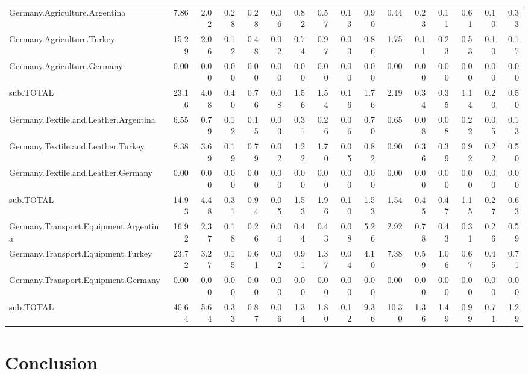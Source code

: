 \documentclass[a4paper]{article}\usepackage[]{graphicx}\usepackage[]{color}
\begin{document}
\begin{sidewaystable}[htbp]
\begin{tabular}{lrrrrrrrrrrrrrrr}
    Germany.Agriculture.Argentina & 7.86  & 2.02  & 0.28  & 0.28  & 0.06  & 0.82  & 0.57  & 0.13  & 0.90  & 0.44  & 0.23  & 0.11  & 0.61  & 0.10  & 0.33 \\
    Germany.Agriculture.Turkey & 15.29 & 2.06  & 0.12  & 0.48  & 0.02  & 0.74  & 0.97  & 0.03  & 0.86  & 1.75  & 0.11  & 0.23  & 0.53  & 0.10  & 0.17 \\
    Germany.Agriculture.Germany & 0.00  & 0.00  & 0.00  & 0.00  & 0.00  & 0.00  & 0.00  & 0.00  & 0.00  & 0.00  & 0.00  & 0.00  & 0.00  & 0.00  & 0.00 \\
    sub.TOTAL & 23.16 & 4.08  & 0.40  & 0.76  & 0.08  & 1.56  & 1.54  & 0.16  & 1.76  & 2.19  & 0.34  & 0.35  & 1.14  & 0.20  & 0.50 \\
    Germany.Textile.and.Leather.Argentina & 6.55  & 0.79  & 0.12  & 0.15  & 0.03  & 0.31  & 0.26  & 0.06  & 0.70  & 0.65  & 0.08  & 0.08  & 0.22  & 0.05  & 0.13 \\
    Germany.Textile.and.Leather.Turkey & 8.38  & 3.69  & 0.19  & 0.79  & 0.02  & 1.22  & 1.70  & 0.05  & 0.82  & 0.90  & 0.36  & 0.39  & 0.92  & 0.22  & 0.50 \\
    Germany.Textile.and.Leather.Germany & 0.00  & 0.00  & 0.00  & 0.00  & 0.00  & 0.00  & 0.00  & 0.00  & 0.00  & 0.00  & 0.00  & 0.00  & 0.00  & 0.00  & 0.00 \\
    sub.TOTAL & 14.93 & 4.48  & 0.31  & 0.94  & 0.05  & 1.53  & 1.96  & 0.10  & 1.53  & 1.54  & 0.45  & 0.47  & 1.15  & 0.27  & 0.63 \\
    Germany.Transport.Equipment.Argentina & 16.92 & 2.37  & 0.18  & 0.26  & 0.04  & 0.44  & 0.43  & 0.08  & 5.26  & 2.92  & 0.78  & 0.43  & 0.31  & 0.26  & 0.59 \\
    Germany.Transport.Equipment.Turkey & 23.72 & 3.27  & 0.15  & 0.61  & 0.02  & 0.91  & 1.37  & 0.04  & 4.10  & 7.38  & 0.59  & 1.06  & 0.67  & 0.45  & 0.71 \\
    Germany.Transport.Equipment.Germany & 0.00  & 0.00  & 0.00  & 0.00  & 0.00  & 0.00  & 0.00  & 0.00  & 0.00  & 0.00  & 0.00  & 0.00  & 0.00  & 0.00  & 0.00 \\
    sub.TOTAL & 40.64 & 5.64  & 0.33  & 0.87  & 0.06  & 1.34  & 1.80  & 0.12  & 9.36  & 10.30 & 1.36  & 1.49  & 0.99  & 0.71  & 1.29 \\
    \bottomrule
    \end{tabular}
\end{sidewaystable}

\section{Conclusion}
\label{sec:conclusion}

\newpage
\printbibliography
\end{document}
